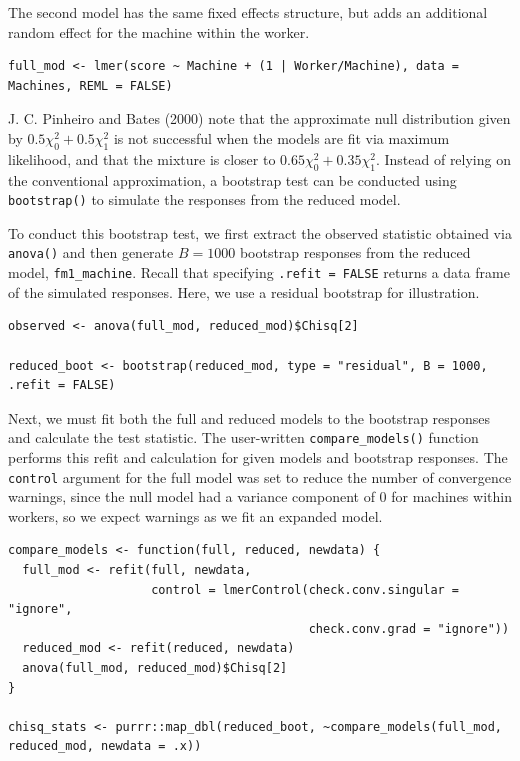 The second model has the same fixed effects structure, but adds an additional random effect for the machine within the worker.

\begin{verbatim}
full_mod <- lmer(score ~ Machine + (1 | Worker/Machine), data = Machines, REML = FALSE)
\end{verbatim}

J. C. Pinheiro and Bates (2000) note that the approximate null distribution given by \(0.5\chi^2_0 + 0.5 \chi^2_1\) is not successful when the models are fit via maximum likelihood, and that the mixture is closer to \(0.65\chi^2_0 + 0.35 \chi^2_1\). Instead of relying on the conventional approximation, a bootstrap test can be conducted using \texttt{bootstrap()} to simulate the responses from the reduced model.

To conduct this bootstrap test, we first extract the observed statistic obtained via \texttt{anova()} and then generate \(B=1000\) bootstrap responses from the reduced model, \texttt{fm1\_machine}. Recall that specifying \texttt{.refit\ =\ FALSE} returns a data frame of the simulated responses. Here, we use a residual bootstrap for illustration.

\begin{verbatim}
observed <- anova(full_mod, reduced_mod)$Chisq[2]

reduced_boot <- bootstrap(reduced_mod, type = "residual", B = 1000, .refit = FALSE)
\end{verbatim}

Next, we must fit both the full and reduced models to the bootstrap responses and calculate the test statistic. The user-written \texttt{compare\_models()} function performs this refit and calculation for given models and bootstrap responses. The \texttt{control} argument for the full model was set to reduce the number of convergence warnings, since the null model had a variance component of 0 for machines within workers, so we expect warnings as we fit an expanded model.

\begin{verbatim}
compare_models <- function(full, reduced, newdata) {
  full_mod <- refit(full, newdata, 
                    control = lmerControl(check.conv.singular = "ignore", 
                                          check.conv.grad = "ignore"))
  reduced_mod <- refit(reduced, newdata)
  anova(full_mod, reduced_mod)$Chisq[2]
}
 
chisq_stats <- purrr::map_dbl(reduced_boot, ~compare_models(full_mod, reduced_mod, newdata = .x))
\end{verbatim}

